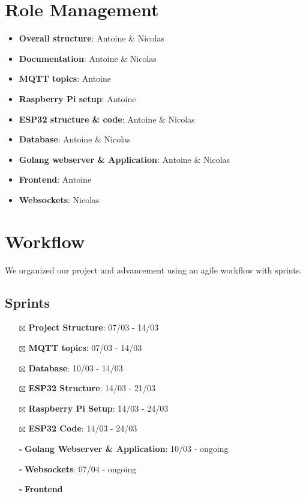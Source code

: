 \documentclass{report}
\begin{document}
    \section{Role Management}\label{sec:role-management}

        \begin{itemize}
            \item \textbf{Overall structure}: Antoine \& Nicolas
            \item \textbf{Documentation}: Antoine \& Nicolas
            \item \textbf{MQTT topics}: Antoine
            \item \textbf{Raspberry Pi setup}: Antoine
            \item \textbf{ESP32 structure \& code}: Antoine \& Nicolas
            \item \textbf{Database}: Antoine \& Nicolas
            \item \textbf{Golang webserver \& Application}: Antoine \& Nicolas
            \item \textbf{Frontend}: Antoine
            \item \textbf{Websockets}: Nicolas
        \end{itemize}

    \section{Workflow}\label{sec:workflow}

        We organized our project and advancement using an agile workflow with sprints.

        \subsection{Sprints}\label{subsec:sprints}

            \begin{itemize}
                \item[$\boxtimes$] \textbf{Project Structure}: 07/03 - 14/03
                \item[$\boxtimes$] \textbf{MQTT topics}: 07/03 - 14/03
                \item[$\boxtimes$] \textbf{Database}: 10/03 - 14/03
                \item[$\boxtimes$] \textbf{ESP32 Structure}: 14/03 - 21/03
                \item[$\boxtimes$] \textbf{Raspberry Pi Setup}: 14/03 - 24/03
                \item[$\boxtimes$] \textbf{ESP32 Code}: 14/03 - 24/03
                \item[$\square$] \textbf{Golang Webserver \& Application}: 10/03 - ongoing
                \item[$\square$] \textbf{Websockets}: 07/04 - ongoing
                \item[$\square$] \textbf{Frontend}
            \end{itemize}
\end{document}
